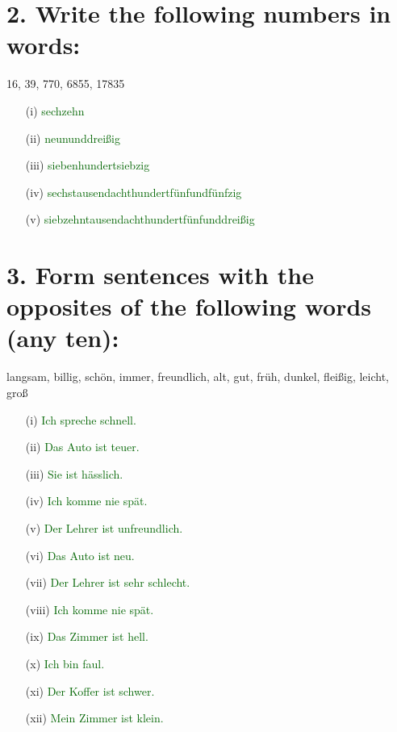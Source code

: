 \documentclass{article}
\begin{document}
\section*{2. Write the following numbers in words:}
16, 39, 770, 6855, 17835
\begin{enumerate}
    \item[(i)] \textcolor{darkgreen}{sechzehn}
    \item[(ii)] \textcolor{darkgreen}{neununddreißig}
    \item[(iii)] \textcolor{darkgreen}{siebenhundertsiebzig}
    \item[(iv)] \textcolor{darkgreen}{sechstausendachthundertfünfundfünfzig}
    \item[(v)] \textcolor{darkgreen}{siebzehntausendachthundertfünfunddreißig}
\end{enumerate}

\section*{3. Form sentences with the opposites of the following words (any ten):}
langsam, billig, schön, immer, freundlich, alt, gut, früh, dunkel, fleißig, leicht, groß
\begin{enumerate}
    \item[(i)] \textcolor{darkgreen}{Ich spreche schnell.}
    \item[(ii)] \textcolor{darkgreen}{Das Auto ist teuer.}
    \item[(iii)] \textcolor{darkgreen}{Sie ist hässlich.}
    \item[(iv)] \textcolor{darkgreen}{Ich komme nie spät.}
    \item[(v)] \textcolor{darkgreen}{Der Lehrer ist unfreundlich.}
    \item[(vi)] \textcolor{darkgreen}{Das Auto ist neu.}
    \item[(vii)] \textcolor{darkgreen}{Der Lehrer ist sehr schlecht.}
    \item[(viii)] \textcolor{darkgreen}{Ich komme nie spät.}
    \item[(ix)] \textcolor{darkgreen}{Das Zimmer ist hell.}
    \item[(x)] \textcolor{darkgreen}{Ich bin faul.}
    \item[(xi)] \textcolor{darkgreen}{Der Koffer ist schwer.}
    \item[(xii)] \textcolor{darkgreen}{Mein Zimmer ist klein.}
\end{enumerate}
\end{document}
